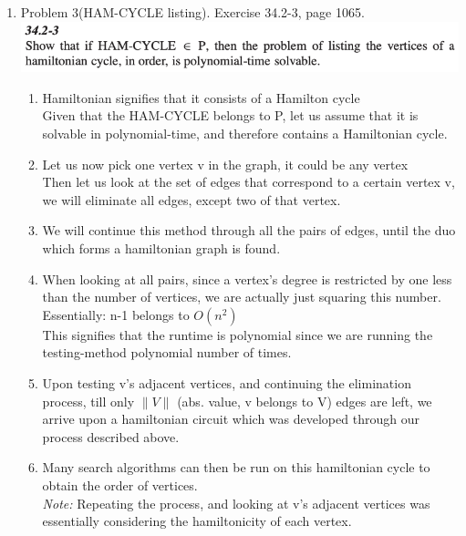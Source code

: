 \documentclass[11pt]{article}
\begin{document}
\begin{enumerate}
\pagebreak

\item Problem 3(HAM-CYCLE listing). Exercise 34.2-3, page 1065.\\
\includegraphics[scale=1]{HW5_Q3.png}
    \begin{enumerate}
        \item Hamiltonian signifies that it consists of a Hamilton cycle\\
        Given that the HAM-CYCLE belongs to P, let us assume that it is solvable in polynomial-time, and therefore contains a Hamiltonian cycle.
        \item Let us now pick one vertex v in the graph, it could be any vertex\\
        Then let us look at the set of edges that correspond to a certain vertex v, we will eliminate all edges, except two of that vertex.
        \item We will continue this method through all the pairs of edges, until the duo which forms a hamiltonian graph is found.
        \item When looking at all pairs, since a vertex's degree is restricted by one less than the number of vertices, we are actually just squaring this number. Essentially: n-1 belongs to $O(n^2)$\\
        This signifies that the runtime is polynomial since we are running the testing-method polynomial number of times.
        \item Upon testing v's adjacent vertices, and continuing the elimination process, till only $\|V\|$ (abs. value, v belongs to V) edges are left, we arrive upon a hamiltonian circuit which was developed through our process described above.
        \item Many search algorithms can then be run on this hamiltonian cycle to obtain the order of vertices. \\
        
        \textit{Note: }Repeating the process, and looking at v's adjacent vertices was essentially considering the hamiltonicity of each vertex.
    \end{enumerate}

\pagebreak


\end{enumerate}
\end{document}

